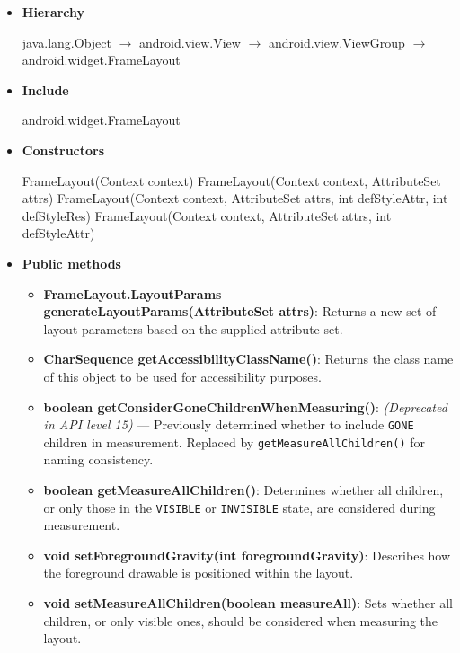 \documentclass{report}
\begin{document}
    \begin{itemize}
        \item \textbf{Hierarchy} 
            \begin{center}
                java.lang.Object $\to$	android.view.View $\to$	android.view.ViewGroup $\to $	android.widget.FrameLayout
            \end{center}
        \item \textbf{Include}
            \bigbreak \noindent 
            \begin{javacode}
                android.widget.FrameLayout
            \end{javacode}
        \item \textbf{Constructors}
            \bigbreak \noindent 
            \begin{javacode}
                FrameLayout(Context context)
                FrameLayout(Context context, AttributeSet attrs)
                FrameLayout(Context context, AttributeSet attrs, int defStyleAttr, int defStyleRes)
                FrameLayout(Context context, AttributeSet attrs, int defStyleAttr)
            \end{javacode}
        \item \textbf{Public methods}
            \begin{itemize}
                \item \textbf{FrameLayout.LayoutParams generateLayoutParams(AttributeSet attrs)}: Returns a new set of layout parameters based on the supplied attribute set.
                \item \textbf{CharSequence getAccessibilityClassName()}: Returns the class name of this object to be used for accessibility purposes.
                \item \textbf{boolean getConsiderGoneChildrenWhenMeasuring()}: \textit{(Deprecated in API level 15)} — Previously determined whether to include \texttt{GONE} children in measurement. Replaced by \texttt{getMeasureAllChildren()} for naming consistency.
                \item \textbf{boolean getMeasureAllChildren()}: Determines whether all children, or only those in the \texttt{VISIBLE} or \texttt{INVISIBLE} state, are considered during measurement.
                \item \textbf{void setForegroundGravity(int foregroundGravity)}: Describes how the foreground drawable is positioned within the layout.
                \item \textbf{void setMeasureAllChildren(boolean measureAll)}: Sets whether all children, or only visible ones, should be considered when measuring the layout.

\end{itemize}
\end{itemize}
\end{document}
